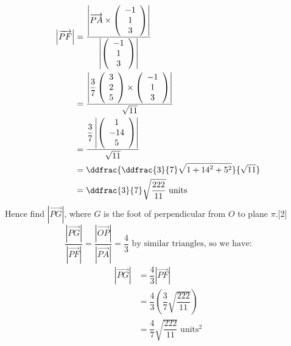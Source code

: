 \documentclass[12pt, a4 paper]{article}
\begin{document}
\begin{outline}[enumerate]
\begin{align*}
						\left| {\overrightarrow {PF} } \right| & = \dfrac{{\left| {\overrightarrow {PA}  \times \left( {\begin{array}{*{20}{c}}{ - 1} \\1\\3\end{array}} \right)} \right|}}{{\left| {\left( {\begin{array}{*{20}{c}}{ - 1}\\1\\3\end{array}} \right)} \right|}}\\ &= \dfrac{{\left| {\dfrac{3}{7}\left( {\begin{array}{*{20}{c}}3\\2\\5\end{array}} \right) \times \left( {\begin{array}{*{20}{c}}{ - 1}\\1\\3\end{array}} \right)} \right|}}{{\sqrt {11} }}\\ &= \dfrac{{\dfrac{3}{7}\left| {\left( {\begin{array}{*{20}{c}}1\\{ - 14}\\5\end{array}} \right)} \right|}}{{\sqrt {11} }}\\ &= \ddfrac{{\ddfrac{3}{7}\sqrt {1 + {{14}^2} + {5^2}} }}{{\sqrt {11} }}\\ &= \ddfrac{3}{7}\sqrt {\dfrac{{222}}{{11}}} {\textrm{ units}}
					\end{align*}
					\color{black}
					\2 Hence find $\left| {\overrightarrow {PG} } \right|$, where $G$ is the foot of perpendicular from $O$ to plane $\pi $.\hfill[2]
					\color{blue}
					\[\dfrac{{\left| {\overrightarrow {PG} } \right|}}{{\left| {\overrightarrow {PF} } \right|}} = \dfrac{{\left| {\overrightarrow {OP} } \right|}}{{\left| {\overrightarrow {PA} } \right|}} = \dfrac{4}{3}{\textrm{ by similar triangles, so we have:}}\]
					\begin{align*}
						\left| {\overrightarrow {PG} } \right| & = \dfrac{4}{3}\left| {\overrightarrow {PF} } \right| \\ &= \dfrac{4}{3}\left( {\dfrac{3}{7}\sqrt {\dfrac{{222}}{{11}}} } \right)\\ &= \dfrac{4}{7}\sqrt {\dfrac{{222}}{{11}}} \;{\textrm{unit}}{{\textrm{s}}^2}
					\end{align*}
					\color{black}
															        

\end{outline}
\end{document}
